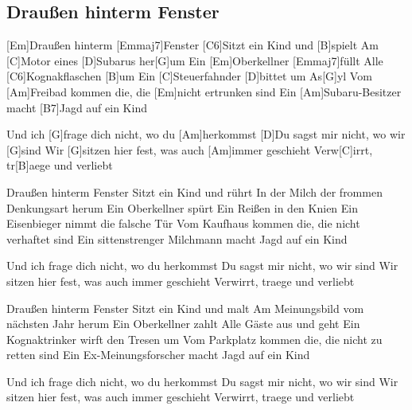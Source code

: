 \subsection*{Draußen hinterm Fenster   }
\begin{guitar}



[Em]Draußen hinterm [Emmaj7]Fenster
[C6]Sitzt ein Kind und [B]spielt
Am [C]Motor eines [D]Subarus her[G]um
Ein [Em]Oberkellner [Emmaj7]füllt
Alle [C6]Kognakflaschen [B]um
Ein [C]Steuerfahnder [D]bittet um As[G]yl
Vom [Am]Freibad kommen die, die [Em]nicht ertrunken sind
Ein [Am]Subaru-Besitzer macht [B7]Jagd auf ein Kind


Und ich [G]frage dich nicht, wo du [Am]herkommst
[D]Du sagst mir nicht, wo wir [G]sind
Wir [G]sitzen hier fest, was auch [Am]immer geschieht
Verw[C]irrt, tr[B]aege und verliebt




Draußen hinterm Fenster
Sitzt ein Kind und rührt
In der Milch der frommen Denkungsart herum
Ein Oberkellner spürt
Ein Reißen in den Knien
Ein Eisenbieger nimmt die falsche Tür
Vom Kaufhaus kommen die, die nicht verhaftet sind
Ein sittenstrenger Milchmann macht Jagd auf ein Kind


Und ich frage dich nicht, wo du herkommst
Du sagst mir nicht, wo wir sind
Wir sitzen hier fest, was auch immer geschieht
Verwirrt, traege und verliebt


Draußen hinterm Fenster
Sitzt ein Kind und malt
Am Meinungsbild vom nächsten Jahr herum
Ein Oberkellner zahlt
Alle Gäste aus und geht
Ein Kognaktrinker wirft den Tresen um
Vom Parkplatz kommen die, die nicht zu retten sind
Ein Ex-Meinungsforscher macht Jagd auf ein Kind


Und ich frage dich nicht, wo du herkommst
Du sagst mir nicht, wo wir sind
Wir sitzen hier fest, was auch immer geschieht
Verwirrt, traege und verliebt 

\end{guitar}

